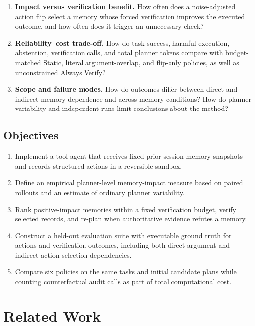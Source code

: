 \documentclass[11pt]{article}
\begin{document}
\begin{enumerate}[label=\textbf{RQ\arabic*:},leftmargin=3.2em]
  \item \textbf{Impact versus verification benefit.} How often does a noise-adjusted action flip select a memory whose forced verification improves the executed outcome, and how often does it trigger an unnecessary check?
  \item \textbf{Reliability--cost trade-off.} How do task success, harmful execution, abstention, verification calls, and total planner tokens compare with budget-matched Static, literal argument-overlap, and flip-only policies, as well as unconstrained Always Verify?
  \item \textbf{Scope and failure modes.} How do outcomes differ between direct and indirect memory dependence and across memory conditions? How do planner variability and independent runs limit conclusions about the method?
\end{enumerate}

\subsection{Objectives}

\begin{enumerate}
  \item Implement a tool agent that receives fixed prior-session memory snapshots and records structured actions in a reversible sandbox.
  \item Define an empirical planner-level memory-impact measure based on paired rollouts and an estimate of ordinary planner variability.
  \item Rank positive-impact memories within a fixed verification budget, verify selected records, and re-plan when authoritative evidence refutes a memory.
  \item Construct a held-out evaluation suite with executable ground truth for actions and verification outcomes, including both direct-argument and indirect action-selection dependencies.
  \item Compare six policies on the same tasks and initial candidate plans while counting counterfactual audit calls as part of total computational cost.
\end{enumerate}

\section{Related Work}
\end{document}
